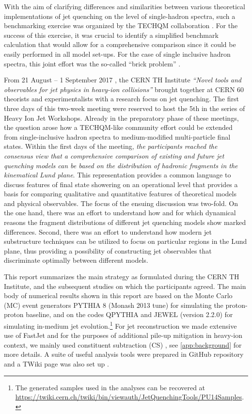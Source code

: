 With the aim of clarifying differences and similarities between various theoretical implementations of jet quenching on the level of single-hadron spectra, such a benchmarking exercise was organized by the TECHQM collaboration \cite{TECHQM}. For the success of this exercise, it was crucial to identify a simplified 
benchmark calculation that would allow for a comprehensive comparison since it could be easily performed in all model set-ups. For the case of single inclusive
hadron spectra, this joint effort was the so-called ``brick problem'' \cite{Armesto:2011ht,Burke:2013yra}.

From 21 August -- 1 September 2017 \cite{THinst}, the CERN TH Institute  \textsl{``Novel tools and observables for jet physics in heavy-ion collisions''} brought 
together at CERN 60 theorists and experimentalists with a research focus on jet quenching. The first three days of this two-week meeting were reserved 
to host the 5th in the series of Heavy Ion Jet Workshops.
Already in the preparatory phase of these meetings, the question arose how a TECHQM-like community 
effort could be extended from single-inclusive hadron spectra to medium-modified multi-particle final states. Within the first days of the meeting, \emph{the 
participants reached the consensus view that a comprehensive comparison of existing and future jet quenching models can be based on the
distribution of hadronic fragments in the kinematical Lund plane}. 
This representation provides a common language to discuss features of final state showering on an operational level that provides a basis for comparing qualitative and quantitative features of theoretical models and physical observables.
The focus of the ensuing discussion was two-fold. On the one hand, there was an effort to understand
how and for which dynamical reasons the fragment distributions of different jet quenching models show marked differences. Second, there was an
effort to understand how modern jet substructure techniques can be utilized to focus on particular regions in the Lund plane, thus providing a possibility of
constructing jet observables that discriminate optimally between different models. 

This report summarizes the main strategy as formulated during the CERN TH Institute, and the subsequent studies on which the participants agreed. 
The main body of numerical results shown in this report are based 
on  the Monte Carlo (MC) event generators PYTHIA 8 \cite{Sjostrand:2007gs}  (Monash 2013 tune) for simulating the proton-proton baseline, and on the 
codes QPYTHIA \cite{Armesto:2009fj} and JEWEL \cite{Zapp:2011ya,Zapp:2012ak} (version 2.2.0) for simulating in-medium jet evolution.\footnote{The generated samples used in the analyses can be recovered at \url{https://twiki.cern.ch/twiki/bin/viewauth/JetQuenchingTools/PU14Samples}.}
For jet reconstruction we made extensive use of FastJet \cite{Cacciari:2005hq,Cacciari:2011ma} and for the purposes of additional pile-up mitigation in heavy-ion context, we mainly used constituent subtraction (CS) \cite{Berta:2014eza}, see \autoref{app:background} for more details. A suite of useful analysis tools were prepared in GitHub repository \cite{cerninstitute-github} and a TWiki page was also set up \cite{cerninstitute-twiki}.

